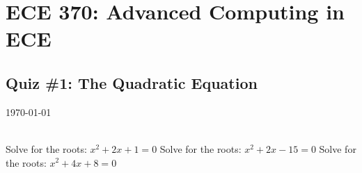 \documentclass{exam}
\begin{document}
\section*{ECE 370: Advanced Computing in ECE}
\subsection*{Quiz \#1: The Quadratic Equation}
\today \\
\vspace{1mm}
\\
\vspace{3mm}

\begin{questions}
 \question Solve for the roots: \(x^2 +2x + 1 = 0\)
 \question Solve for the roots: \(x^2 +2x - 15 = 0\)
 \question Solve for the roots: \(x^2 +4x + 8 = 0\)

\end{questions}
\end{document}
